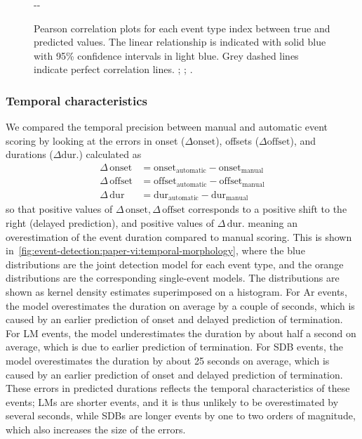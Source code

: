 \begin{figure}
\begin{adjustwidth*}{}{-\marginparwidth-\marginparsep}
    \caption[Correlation between true and predicted indices]{Pearson correlation plots for each event type index between true and predicted values. The linear relationship is indicated with solid blue with 95\% confidence intervals in light blue.
    Grey dashed lines indicate perfect correlation lines.
    ; %
    ; %
    .}
    \label{fig:event-detection:paper-vi:correlation_plot}
    \end{adjustwidth*}
\end{figure}


\subsubsection{Temporal characteristics}
We compared the temporal precision between manual and automatic event scoring by looking at the errors in onset (\(\Delta\text{onset}\)), offsets (\(\Delta\text{offset}\)), and durations (\(\Delta\text{dur.}\)) calculated as
\begin{align}
    \Delta\,\text{onset} &= \text{onset}_{\text{automatic}} - \text{onset}_{\text{manual}} \\
    \Delta\,\text{offset} &= \text{offset}_{\text{automatic}} - \text{offset}_{\text{manual}} \\
    \Delta\,\text{dur} &= \text{dur}_{\text{automatic}} - \text{dur}_{\text{manual}}
\end{align}
so that positive values of \(\Delta\,\text{onset}, \Delta\,\text{offset}\) corresponds to a positive shift to the right (delayed prediction), and positive values of \(\Delta\,\text{dur.}\) meaning an overestimation of the event duration compared to manual scoring.
This is shown in~\cref{fig:event-detection:paper-vi:temporal-morphology}, where the blue distributions are the joint detection model for each event type, and the orange distributions are the corresponding single-event models. 
The distributions are shown as kernel density estimates superimposed on a histogram.
For \ac{Ar} events, the model overestimates the duration on average by a couple of seconds, which is caused by an earlier prediction of onset and delayed prediction of termination.
For \ac{LM} events, the model underestimates the duration by about half a second on average, which is due to earlier prediction of termination.
For \ac{SDB} events, the model overestimates the duration by about 25 seconds on average, which is caused by an earlier prediction of onset and delayed prediction of termination.
These errors in predicted durations reflects the temporal characteristics of these events; \acp{LM} are shorter events, and it is thus unlikely to be overestimated by several seconds, while \acp{SDB} are longer events by one to two orders of magnitude, which also increases the size of the errors. 
